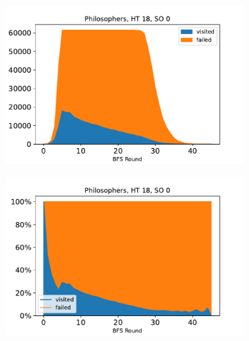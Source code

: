 \documentclass[
fancyheadings, %
%
%
]{stsreprt}
\begin{document}
\begin{figure}[p]
    \begin{subfigure}[b]{.5\textwidth}
        \centering
        \includegraphics[width=\textwidth]{../evaluation/output-assets/EXP-11-bfs-frontiers-2.pdf}
        \label{fig:evaluation:EXP-11:2}
    \end{subfigure}
    \begin{subfigure}[b]{.5\textwidth}
        \centering
        \includegraphics[width=\textwidth]{../evaluation/output-assets/EXP-11-bfs-frontiers-6.pdf}
        \label{fig:evaluation:EXP-11:6}
    \end{subfigure}


\end{figure}
\end{document}
